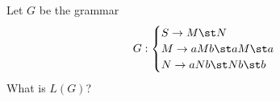 Let $G$ be the grammar
\[
G:
\begin{cases}
S \rightarrow M \st N \\
M \rightarrow aMb \st aM \st a \\
N \rightarrow aNb \st Nb \st b
\end{cases}
\]
What is $L(G)$?
